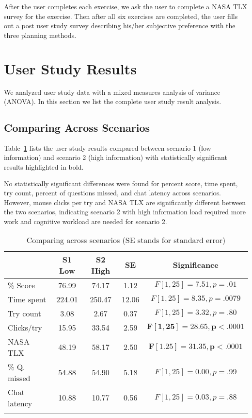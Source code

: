 After the user completes each exercise, we ask the user to complete a NASA TLX survey for the exercise. Then after all six exercises are completed, the user fills out a post user study survey describing his/her subjective preference with the three planning methods.

\section{User Study Results} 
\label{sec:AResults}

We analyzed user study data with a mixed measures analysis of variance (ANOVA). In this section we list the complete user study result analysis.

\subsection{Comparing Across Scenarios}

Table~\ref{AAcrossScenarios} lists the user study results compared between scenario 1 (low information) and scenario 2 (high information) with statistically significant results highlighted in bold.

No statistically significant differences were found for percent score, time spent, try count, percent of questions missed, and chat latency across scenarios. However, mouse clicks per try and NASA TLX are significantly different between the two scenarios, indicating scenario 2 with high information load required more work and cognitive workload are needed for scenario 2.

\begin{table}[hbtp]
\caption{Comparing across scenarios (SE stands for standard error)}
	\centering
		\begin{tabular}
			{|l|c|c|c|c|}
			\hline
			& S1 Low & S2 High & SE & Significance \\
			\hline
			\% Score & 76.99 & 74.17 & 1.12 & $F[1,25]=7.51, p=.01$ \\
			Time spent & 224.01 & 250.47 & 12.06 & $F[1,25]=8.35, p=.0079$ \\
			Try count & 3.08 & 2.67 & 0.37 & $F[1,25]=3.32, p=.80$ \\
			Clicks/try	& 15.95 & 33.54 & 2.59 & $\boldsymbol{F[1,25]=28.65, p<.0001}$ \\ 
			NASA TLX & 48.19 & 58.17 & 2.50 & $\boldsymbol{F[1.25]=31.35, p<.0001}$ \\ 
			\hline
			\% Q. missed & 54.88 & 54.90 & 5.18 & $F[1,25]=0.00, p=.99$ \\ 
			Chat latency & 10.88 & 10.77 & 0.56 & $F[1,25]=0.03, p=.88$ \\ 
			\hline			
			\multicolumn{5}{c}{}  %
		\end{tabular}
\label{AAcrossScenarios}
\end{table}

